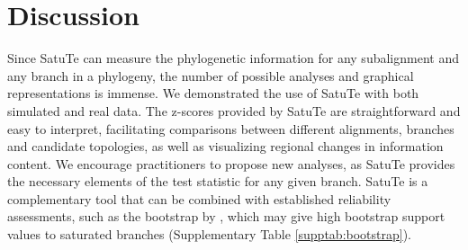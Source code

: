 \bigskip









\section*{Discussion}




Since SatuTe can measure the phylogenetic information for any subalignment and any branch in a phylogeny, the number of possible analyses and graphical representations is immense. We demonstrated the use of SatuTe with both simulated and real data. The z-scores provided by SatuTe are straightforward and easy to interpret, facilitating comparisons between different alignments, branches and candidate topologies, as well as visualizing regional changes in information content. We encourage practitioners to propose new analyses, as SatuTe provides the necessary elements of the test statistic for any given branch. SatuTe is a complementary tool that can be combined with established reliability assessments, such as the bootstrap by , which may give high bootstrap support values to saturated branches (Supplementary Table \ref{supptab:bootstrap}).




